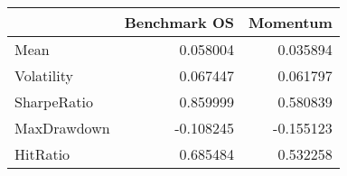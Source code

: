 \begin{tabular}{lrr}
\toprule
{} &  Benchmark OS &  Momentum \\
\midrule
Mean        &      0.058004 &  0.035894 \\
Volatility  &      0.067447 &  0.061797 \\
SharpeRatio &      0.859999 &  0.580839 \\
MaxDrawdown &     -0.108245 & -0.155123 \\
HitRatio    &      0.685484 &  0.532258 \\
\bottomrule
\end{tabular}
